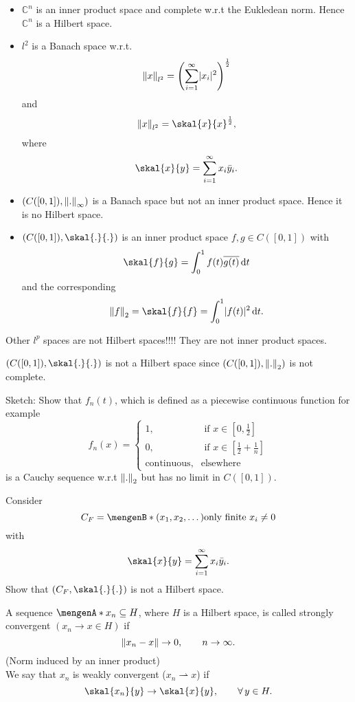\begin{beispiele}
	\begin{itemize}
		\item $\mathbb{C}^n$ is an inner product space and complete w.r.t the Eukledean norm. Hence $\mathbb{C}^n$ is a Hilbert space.
		\item $l^2$ is a Banach space w.r.t. 
		\[
			\norm{x}_{l^2} = \left( \sum_{i=1}^{\infty} \abs{x_i}^2 \right)^{\frac{1}{2}}
		\]
		and
		\[
			\norm{x}_{l^2} = \skal{x}{x}^{\frac{1}{2}},
		\]
		where
		\[
			\skal{x}{y} = \sum_{i=1}^{\infty} x_i \bar{y}_i.
		\]
		\item $(C([0,1]), \norm{.}_{\infty})$ is a Banach space but not an inner product space. Hence it is no Hilbert space.
		\item $(C([0,1]),\skal{.}{.})$ is an inner product space $f,g \in C([0,1])$ with
		\[
			\skal{f}{g} = \int_{0}^{1} f(t) \overline{g(t)} \,\mathrm{d}t
		\]
		and the corresponding
		\[
			\norm{f}_2 = \skal{f}{f} = \int_{0}^{1} \abs{f(t)}^2 \,\mathrm{d}t.
		\]
	\end{itemize}
\end{beispiele}
\begin{bemerkung}
	Other $l^p$ spaces are not Hilbert spaces!!!! They are not inner product spaces.
\end{bemerkung}

\begin{satz}
	$(C([0,1]), \skal{.}{.})$ is not a Hilbert space since $(C([0,1]), \norm{.}_2)$ is not complete.
\end{satz}

\begin{beweis}
	Sketch: Show that $f_n(t)$, which is defined as a piecewise continuous function for example
	\[
		f_n(x)= \begin{cases}
			1, &\text{ if }x \in [0,\frac{1}{2}]\\
			0, &\text{ if }x \in [\frac{1}{2} + \frac{1}{n}] \\
			\text{continuous}, & \text{elsewhere} 
		\end{cases}
	\] is a Cauchy sequence w.r.t $\norm{.}_2$ but has no limit in $C([0,1])$.
\end{beweis}

Consider
\[
	C_F = \set[(x_1,x_2,\dots)]{\text{only finite }x_i \neq 0} 
\]
with \[
	\skal{x}{y} = \sum_{i=1}^{\infty} x_i \bar{y}_i.
\]
Show that $(C_F, \skal{.}{.})$ is not a Hilbert space.

\begin{definition}
	A sequence $\set{x_n} \subseteq H$, where $H$ is a Hilbert space, is called strongly convergent $(x_n \to x \in H)$ if 
	\[
		\norm{x_n -x} \to 0, \qquad n \to  \infty.
	\]
	(Norm induced by an inner product) \\ We say that $x_n$ is weakly convergent ($x_n \rightharpoonup x$) if
	\[
		\skal{x_n}{y} \to \skal{x}{y}, \qquad \forall\, y \in H.
	\]
\end{definition}

